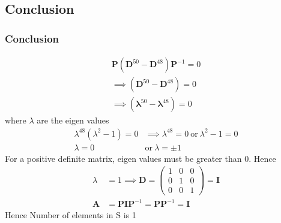 \documentclass{beamer}
\providecommand{\brak}[1]{\ensuremath{\left(#1\right)}}
\theoremstyle{remark}
\newcommand{\myvec}[1]{\ensuremath{\begin{pmatrix}#1\end{pmatrix}}}
\let\vec\mathbf
\numberwithin{equation}{section}
\begin{document}
\subsection{Conclusion}
\begin{frame}
\frametitle{Conclusion}
  \begin{align}
   \vec{P}\brak{\vec{D}^{50}-\vec{D}^{48}}\vec{P}^{-1}=0 \\
   \implies \brak{\vec{D}^{50}-\vec{D}^{48}}=0\\
   \implies \brak{\vec{\lambda}^{50}-\vec{\lambda}^{48}}=0
 \end{align}
 where $\lambda$ are the eigen values
\begin{align}
    \lambda^{48}\brak{\lambda^2-1}=0&\implies
    \lambda^{48}=0\ \text{or}\ \lambda^{2}-1=0 \\
     \lambda=0\ &\text{or}\ \lambda=\pm1
\end{align}
For a positive definite matrix, eigen values must be greater than 0. Hence
\begin{align}
    \lambda&=1 \implies
    \vec{D}=\myvec{1&0&0\\0&1&0\\0&0&1}=\vec{I}\\
    \vec{A}&=\vec{P}\vec{I}\vec{P}^{-1}
    =\vec{P}\vec{P}^{-1}=\vec{I}
\end{align}
Hence Number of elements in S is 1
 \end{frame}
 
\end{document}

